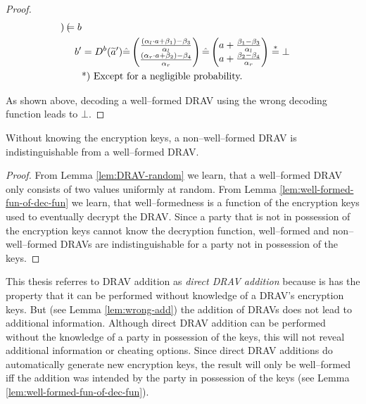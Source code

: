 \begin{proof}
\begin{align*}
\begin{pmatrix}
    \end{pmatrix}
    = b\\
    b' &= D^b(\widetilde{a}')
    \hat{=}
    \begin{pmatrix}
      \frac{(\alpha_l \cdot a + \beta_1) - \beta_3}{\alpha_l}\\
      \frac{(\alpha_r \cdot a + \beta_2) - \beta_4}{\alpha_r}\\
    \end{pmatrix}
    \hat{=}
    \begin{pmatrix}
      a +
      \frac{\beta_1 - \beta_3}{\alpha_l}\\
      a +
      \frac{\beta_2 - \beta_4}{\alpha_r}\\
    \end{pmatrix}
    \stackrel{*}{=} \bot\\
    &\text{*) Except for a negligible probability.}{}
  \end{align*}

  \noindent{}As shown above, decoding a well--formed DRAV using the wrong
  decoding function leads to $\bot$.

\end{proof}


\begin{lem}
  \label{lem:DRAV-indistinguishable}

  Without knowing the encryption keys, a non--well--formed DRAV is
  indistinguishable from a well--formed DRAV.

\end{lem}
\begin{proof}

  From Lemma \ref{lem:DRAV-random} we learn, that a well--formed DRAV only
  consists of two values uniformly at random. From Lemma
  \ref{lem:well-formed-fun-of-dec-fun} we learn, that well--formedness is a
  function of the encryption keys used to eventually decrypt the DRAV. Since a
  party that is not in possession of the encryption keys cannot know the
  decryption function, well--formed and non--well--formed DRAVs are
  indistinguishable for a party not in possession of the keys.

\end{proof}


\label{sec:DRAV-addition}

This thesis referres to DRAV addition as \emph{direct DRAV addition} because is
has the property that it can be performed without knowledge of a DRAV's
encryption keys. But (see Lemma \ref{lem:wrong-add}) the addition of DRAVs does
not lead to additional information. Although direct DRAV addition can be
performed without the knowledge of a party in possession of the keys, this will
not reveal additional information or cheating options. Since direct DRAV
additions do automatically generate new encryption keys, the result will only be
well--formed iff the addition was intended by the party in possession of the
keys (see Lemma \ref{lem:well-formed-fun-of-dec-fun}).

